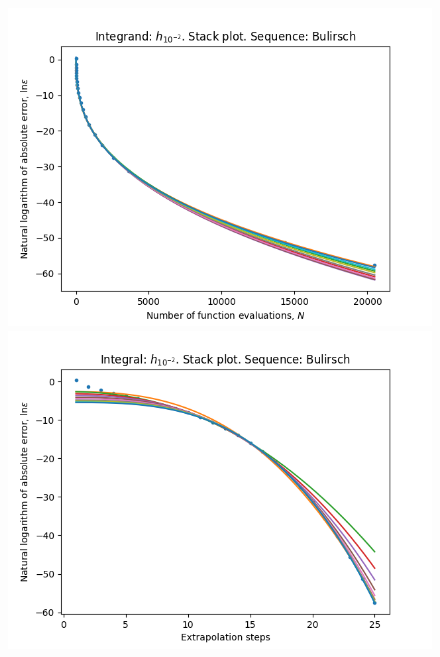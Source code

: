 \begin{figure}[H]
\centering
\begin{minipage}{0.45\textwidth}
\centering
\includegraphics[scale=0.45]{../results/romberg_plots/h_hundredth_hp_bulirsch_stack.png}
\end{minipage}
\begin{minipage}{0.45\textwidth}
\centering
\includegraphics[scale=0.45]{../results/romberg_plots/h_hundredth_hp_bulirsch_steps_stack.png}
\end{minipage}
\end{figure}

